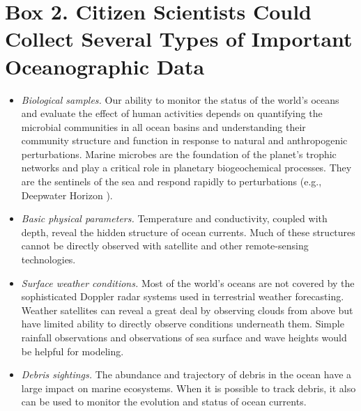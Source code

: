 \section{Box 2. Citizen Scientists Could Collect Several Types of Important Oceanographic Data}

\begin{itemize}

\item{\em Biological samples.} Our ability to monitor the status of the world's oceans and evaluate the effect of human activities depends on quantifying the microbial communities in all ocean basins and understanding their community structure and function in response to natural and anthropogenic perturbations. Marine microbes are the foundation of the planet's trophic networks and play a critical role in planetary biogeochemical processes. They are the sentinels of the sea and respond rapidly to perturbations (e.g., Deepwater Horizon \cite{hazen_deep-sea_2010}).

\item{\em Basic physical parameters.} Temperature and conductivity, coupled with depth, reveal the hidden structure of ocean currents. Much of these structures cannot be directly observed with satellite and other remote-sensing technologies.

\item{\em Surface weather conditions.} Most of the world's oceans are not covered by the sophisticated Doppler radar systems used in terrestrial weather forecasting. Weather satellites can reveal a great deal by observing clouds from above but have limited ability to directly observe conditions underneath them. Simple rainfall observations and observations of sea surface and wave heights would be helpful for modeling.

\item{\em Debris sightings.} The abundance and trajectory of debris in the ocean have a large impact on marine ecosystems. When it is possible to track debris, it also can be used to monitor the evolution and status of ocean currents.

\end{itemize}